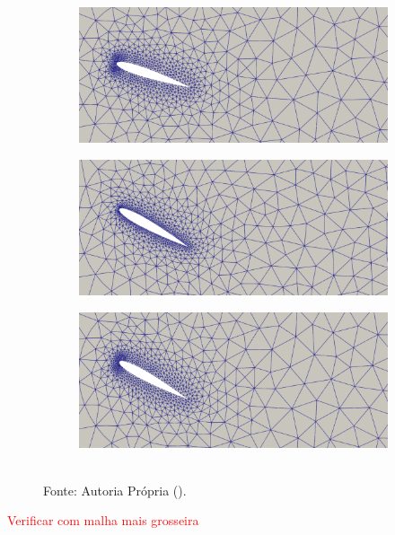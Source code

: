 \begin{figure}[h!]
\begin{subfigure}{.49\linewidth}
    \end{subfigure}
    \begin{subfigure}{.49\linewidth}
        \centering
        \includegraphics[width=\linewidth]{Figuras/rotating-airfoil/m22.png}
    \end{subfigure}
    \caption*{Instante $t=8,2$.}
    \begin{subfigure}{.49\linewidth}
        \centering
        \includegraphics[width=\linewidth]{Figuras/rotating-airfoil/m13.png}
    \end{subfigure}
    \begin{subfigure}{.49\linewidth}
        \centering
        \includegraphics[width=\linewidth]{Figuras/rotating-airfoil/m23.png}
    \end{subfigure}
    \\Fonte: Autoria Própria (\the\year).
    \label{fig:mesh}
\end{figure}

\textcolor{red}{Verificar com malha mais grosseira}